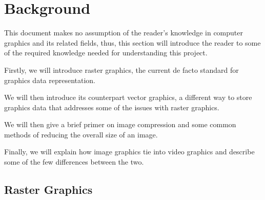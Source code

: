 \documentclass[12pt]{article}
\newcommand{\sentence}{} %
\begin{document}


    \pagebreak


    \section{Background}\label{sec:background}

    \tab
    This document makes no assumption of the reader's knowledge in computer graphics and its related fields,
    thus, this section will introduce the reader to some of the required knowledge needed for understanding this
    project.
    \sentence
    Firstly, we will introduce raster graphics, the current de facto standard for graphics data representation.
    \sentence
    We will then introduce its counterpart vector graphics, a different way to store graphics data that addresses
    some of the issues with raster graphics.
    \sentence
    We will then give a brief primer on image compression and some common methods of reducing the overall size
    of an image.
    \sentence
    Finally, we will explain how image graphics tie into video graphics and describe some of the few differences
    between the two.

    \subsection{Raster Graphics}\label{subsec:raster-graphics}

\end{document}
